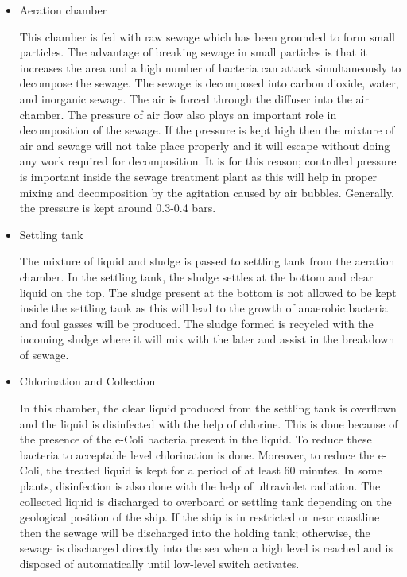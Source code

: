 \documentclass[11pt,a4paper]{article}
\begin{document}
\begin{itemize}
\item Aeration chamber

 This chamber is fed with raw sewage which has been grounded to form small particles. The advantage of breaking sewage in small particles is that it increases the area and a high number of bacteria can attack simultaneously to decompose the sewage. The sewage is decomposed into carbon dioxide, water, and inorganic sewage. The air is forced through the diffuser into the air chamber. The pressure of air flow also plays an important role in decomposition of the sewage. If the pressure is kept high then the mixture of air and sewage will not take place properly and it will escape without doing any work required for decomposition. It is for this reason; controlled pressure is important inside the sewage treatment plant as this will help in proper mixing and decomposition by the agitation caused by air bubbles. Generally, the pressure is kept around 0.3-0.4 bars.

 \item Settling tank

The mixture of liquid and sludge is passed to settling tank from the aeration chamber. In the settling tank, the sludge settles at the bottom and clear liquid on the top. The sludge present at the bottom is not allowed to be kept inside the settling tank as this will lead to the growth of anaerobic bacteria and foul gasses will be produced. The sludge formed is recycled with the incoming sludge where it will mix with the later and assist in the breakdown of sewage.

\item Chlorination and Collection

In this chamber, the clear liquid produced from the settling tank is overflown and the liquid is disinfected with the help of chlorine. This is done because of the presence of the e-Coli bacteria present in the liquid. To reduce these bacteria to acceptable level chlorination is done. Moreover, to reduce the e-Coli, the treated liquid is kept for a period of at least 60 minutes. In some plants, disinfection is also done with the help of ultraviolet radiation. The collected liquid is discharged to overboard or settling tank depending on the geological position of the ship. If the ship is in restricted or near coastline then the sewage will be discharged into the holding tank; otherwise, the sewage is discharged directly into the sea when a high level is reached and is disposed of automatically until low-level switch activates.
\end{itemize}
\newpage
\end{document}
